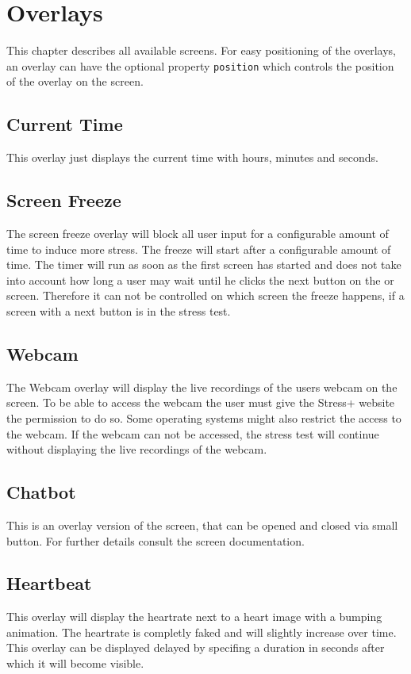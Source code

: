 \section{Overlays}
\label{sec:overlays}

This chapter describes all available screens.
For easy positioning of the overlays, an overlay can have the optional property \texttt{position} which controls the position of the overlay on the screen.

\subsection{Current Time}
\label{sec:overlays-current-time}
This overlay just displays the current time with hours, minutes and seconds.

\subsection{Screen Freeze}
\label{sec:overlays-screen-freeze}
The screen freeze overlay will block all user input for a configurable amount of time to induce more stress.
The freeze will start after a configurable amount of time.
The timer will run as soon as the first screen has started and does not take into account how long a user may wait until he clicks the next button on the  or  screen.
Therefore it can not be controlled on which screen the freeze happens, if a screen with a next button is in the stress test.

\subsection{Webcam}
\label{sec:overlays-webcam}
The Webcam overlay will display the live recordings of the users webcam on the screen.
To be able to access the webcam the user must give the Stress+ website the permission to do so.
Some operating systems might also restrict the access to the webcam.
If the webcam can not be accessed, the stress test will continue without displaying the live recordings of the webcam.

\subsection{Chatbot}
\label{sec:overlays-chatbot}
This is an overlay version of the  screen, that can be opened and closed via small button.
For further details consult the  screen documentation.


\subsection{Heartbeat}
\label{sec:overlays-heartbeat}
This overlay will display the heartrate next to a heart image with a bumping animation.
The heartrate is completly faked and will slightly increase over time.
This overlay can be displayed delayed by specifing a duration in seconds after which it will become visible.
